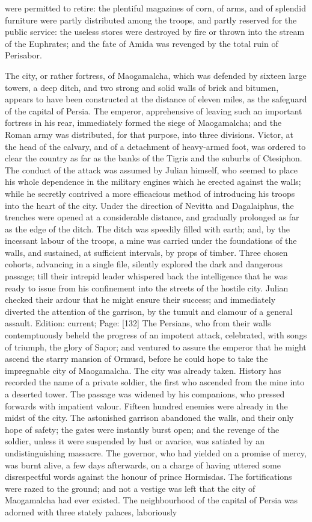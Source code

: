 were permitted to retire: the plentiful magazines of corn, of arms, and of splendid furniture were partly distributed among the troops, and partly reserved for the public service: the useless stores were destroyed by fire or thrown into the stream of the Euphrates; and the fate of Amida was revenged by the total ruin of Perisabor.

The city, or rather fortress, of Maogamalcha, which was defended by sixteen large towers, a deep ditch, and two strong and solid walls of brick and bitumen, appears to have been constructed at the distance of eleven miles, as the safeguard of the capital of Persia. The emperor, apprehensive of leaving such an important fortress in his rear, immediately formed the siege of Maogamalcha; and the Roman army was distributed, for that purpose, into three divisions. Victor, at the head of the calvary, and of a detachment of heavy-armed foot, was ordered to clear the country as far as the banks of the Tigris and the suburbs of Ctesiphon. The conduct of the attack was assumed by Julian himself, who seemed to place his whole dependence in the military engines which he erected against the walls; while he secretly contrived a more efficacious method of introducing his troops into the heart of the city. Under the direction of Nevitta and Dagalaiphus, the trenches were opened at a considerable distance, and gradually prolonged as far as the edge of the ditch. The ditch was speedily filled with earth; and, by the incessant labour of the troops, a mine was carried under the foundations of the walls, and sustained, at sufficient intervals, by props of timber. Three chosen cohorts, advancing in a single file, silently explored the dark and dangerous passage; till their intrepid leader whispered back the intelligence that he was ready to issue from his confinement into the streets of the hostile city. Julian checked their ardour that he might ensure their success; and immediately diverted the attention of the garrison, by the tumult and clamour of a general assault. Edition: current; Page: [132] The Persians, who from their walls contemptuously beheld the progress of an impotent attack, celebrated, with songs of triumph, the glory of Sapor; and ventured to assure the emperor that he might ascend the starry mansion of Ormusd, before he could hope to take the impregnable city of Maogamalcha. The city was already taken. History has recorded the name of a private soldier, the first who ascended from the mine into a deserted tower. The passage was widened by his companions, who pressed forwards with impatient valour. Fifteen hundred enemies were already in the midst of the city. The astonished garrison abandoned the walls, and their only hope of safety; the gates were instantly burst open; and the revenge of the soldier, unless it were suspended by lust or avarice, was satiated by an undistinguishing massacre. The governor, who had yielded on a promise of mercy, was burnt alive, a few days afterwards, on a charge of having uttered some disrespectful words against the honour of prince Hormisdas. The fortifications were razed to the ground; and not a vestige was left that the city of Maogamalcha had ever existed. The neighbourhood of the capital of Persia was adorned with three stately palaces, laboriously 